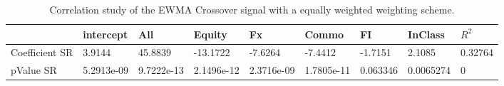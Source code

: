 \begin{table}[H]
\centering
\begin{tabular}{lllllllll}
\hline& intercept & All & Equity & Fx & Commo & FI & InClass & $R^{2}$ \\ 
\hline 
Coefficient SR & 3.9144 & 45.8839 & -13.1722 & -7.6264 & -7.4412 & -1.7151 & 2.1085 & 0.32764 \\ 
pValue SR & 5.2913e-09 & 9.7222e-13 & 2.1496e-12 & 2.3716e-09 & 1.7805e-11 & 0.063346 & 0.0065274 & 0 \\ 
\hline
\end{tabular}
\caption{Correlation study of the EWMA Crossover signal with a equally weighted weighting scheme.}
\label{MBBSEWNR_CORR}
\end{table}